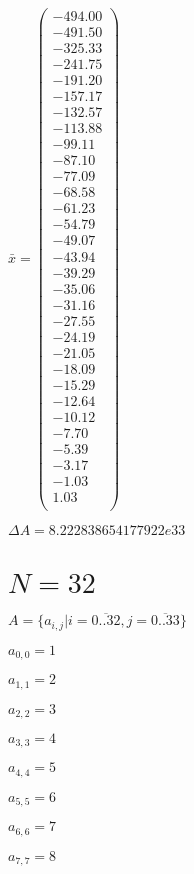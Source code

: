 \documentclass[a4paper,12pt]{article}
\begin{document}
$\bar { x } = \begin{pmatrix}
-494.00 \\
-491.50 \\
-325.33 \\
-241.75 \\
-191.20 \\
-157.17 \\
-132.57 \\
-113.88 \\
-99.11 \\
-87.10 \\
-77.09 \\
-68.58 \\
-61.23 \\
-54.79 \\
-49.07 \\
-43.94 \\
-39.29 \\
-35.06 \\
-31.16 \\
-27.55 \\
-24.19 \\
-21.05 \\
-18.09 \\
-15.29 \\
-12.64 \\
-10.12 \\
-7.70 \\
-5.39 \\
-3.17 \\
-1.03 \\
1.03 \\
\end{pmatrix}
$

$\Delta A = 8.222838654177922e33$



\section{ $N = 32$ }
$A = \{ a _{ i, j } | i = \overline { 0..32 }, j = \overline { 0..33 } \}$

$a _{ 0, 0 } = 1$

$a _{ 1, 1 } = 2$

$a _{ 2, 2 } = 3$

$a _{ 3, 3 } = 4$

$a _{ 4, 4 } = 5$

$a _{ 5, 5 } = 6$

$a _{ 6, 6 } = 7$

$a _{ 7, 7 } = 8$
\end{document}
